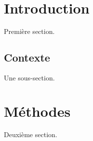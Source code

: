 \documentclass{article}
\begin{document}
\hsize=380pt
\tableofcontents
\section{Introduction}
Premi\`ere section.
\subsection{Contexte}
Une sous-section.
\section{M\'ethodes}
Deuxi\`eme section.
\end{document}
